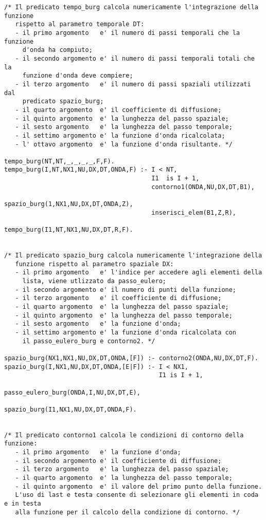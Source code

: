 \begin{verbatim}
/* Il predicato tempo_burg calcola numericamente l'integrazione della funzione 
   rispetto al parametro temporale DT:
   - il primo argomento   e' il numero di passi temporali che la funzione
     d'onda ha compiuto;
   - il secondo argomento e' il numero di passi temporali totali che la
     funzione d'onda deve compiere; 
   - il terzo argomento   e' il numero di passi spaziali utilizzati dal
     predicato spazio_burg;
   - il quarto argomento  e' il coefficiente di diffusione;         
   - il quinto argomento  e' la lunghezza del passo spaziale;
   - il sesto argomento   e' la lunghezza del passo temporale;
   - il settimo argomento e' la funzione d'onda ricalcolata;
   - l' ottavo argomento  e' la funzione d'onda risultante. */

tempo_burg(NT,NT,_,_,_,_,F,F).
tempo_burg(I,NT,NX1,NU,DX,DT,ONDA,F) :- I < NT,
                                        I1  is I + 1,
                                        contorno1(ONDA,NU,DX,DT,B1),
                                        spazio_burg(1,NX1,NU,DX,DT,ONDA,Z),
                                        inserisci_elem(B1,Z,R),
                                        tempo_burg(I1,NT,NX1,NU,DX,DT,R,F).


/* Il predicato spazio_burg calcola numericamente l'integrazione della
   funzione rispetto al parametro spaziale DX:
   - il primo argomento   e' l'indice per accedere agli elementi della 
     lista, viene utlizzato da passo_eulero; 
   - il secondo argomento e' il numero di punti della funzione; 
   - il terzo argomento   e' il coefficiente di diffusione;  
   - il quarto argomento  e' la lunghezza del passo spaziale;
   - il quinto argomento  e' la lunghezza del passo temporale;
   - il sesto argomento   e' la funzione d'onda;
   - il settimo argomento e' la funzione d'onda ricalcolata con 
     il passo_eulero_burg e contorno2. */

spazio_burg(NX1,NX1,NU,DX,DT,ONDA,[F]) :- contorno2(ONDA,NU,DX,DT,F).
spazio_burg(I,NX1,NU,DX,DT,ONDA,[E|F]) :- I < NX1,
                                          I1 is I + 1,
                                          passo_eulero_burg(ONDA,I,NU,DX,DT,E),
                                          spazio_burg(I1,NX1,NU,DX,DT,ONDA,F).


/* Il predicato contorno1 calcola le condizioni di contorno della funzione:
   - il primo argomento   e' la funzione d'onda;
   - il secondo argomento e' il coefficiente di diffusione;
   - il terzo argomento   e' la lunghezza del passo spaziale;
   - il quarto argomento  e' la lunghezza del passo temporale;
   - il quinto argomento  e' il valore del primo punto della funzione.
   L'uso di last e testa consente di selezionare gli elementi in coda e in testa
   alla funzione per il calcolo della condizione di contorno. */


\end{verbatim}
